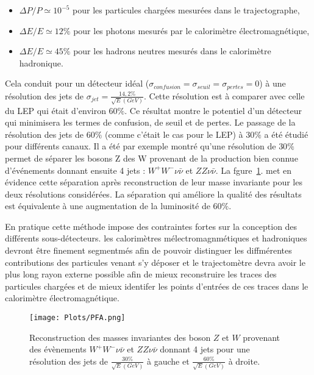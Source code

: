 \begin{itemize}
\item $\Delta P/P\simeq{10^{-5}}$ pour les particules charg\'ees mesur\'ees dans le trajectographe,
\item $\Delta E/E\simeq{12\%}$ pour les photons mesur\'es par le calorim\`etre \'electromagn\'etique,
\item $\Delta E/E\simeq{45\%}$ pour les hadrons neutres mesur\'es dans le calorim\`etre hadronique.
\end{itemize}
Cela conduit pour un d\'etecteur id\'eal (${\sigma}_{confusion} = {\sigma}_{seuil} = {\sigma}_{pertes} = 0$) \`a une r\'esolution des jets de ${\sigma}_{jet}=\frac{14,2\%}{\sqrt{E}(GeV)}$. Cette r\'esolution est \`a comparer avec celle du LEP qui \'etait d'environ $60\%$. Ce r\'esultat montre le potentiel d'un d\'etecteur qui minimisera les termes de confusion, de seuil et de pertes. Le passage de la r\'esolution des jets de $60\%$ (comme c'\'etait le cas pour le LEP) \`a $30\%$ a \'et\'e \'etudi\'e pour diff\'erents canaux. Il a \'et\'e par exemple montr\'e qu'une r\'esolution de $30\%$ permet de s\'eparer les bosons Z des W provenant de la production bien connue d'\'ev\'enements donnant ensuite 4 jets : $W^+W^- \nu \bar{\nu}$ et $ZZ \nu \bar{\nu}$. La fgure~\ref{figure:4.3}. met en \'evidence cette s\'eparation apr\`es reconstruction de leur masse invariante pour les deux r\'esolutions consid\'er\'ees. La s\'eparation qui am\'eliore la qualit\'e des r\'esultats est \'equivalente \`a une augmentation de la luminosit\'e de $60\%$.
~\par En pratique cette m\'ethode impose des contraintes fortes sur la conception des diff\'erents sous-d\'etecteurs. les calorim\`etres m\'electromagnm\'etiques et hadroniques devront \^etre finement segmentm\'es afin de pouvoir distinguer les diffm\'erentes contributions des particules venant s'y d\'eposer et le trajectom\`etre devra avoir le plus long rayon externe possible afin de mieux reconstruire les traces des particules charg\'ees et de mieux identifer les points d'entr\'ees de ces traces dans le calorim\`etre \'electromagn\'etique.

\begin{figure}[H]
\centering
\texttt{[image: Plots/PFA.png]}
\caption{Reconstruction des masses invariantes des boson $Z$ et $W$ provenant des \'ev\`enements $W^+W^- \nu \bar{\nu}$ et $ZZ \nu \bar{\nu}$ donnant 4 jets pour une r\'esolution des jets de $\frac{30\%}{\sqrt{E}(GeV)}$ \`a gauche et $\frac{60\%}{\sqrt{E}(GeV)}$ \`a droite.}
\label{figure:4.3}
\end{figure} 


